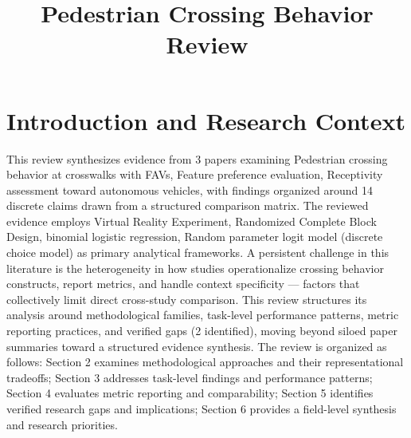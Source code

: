 \documentclass{article}
\title{Pedestrian Crossing Behavior Review}
\begin{document}
\maketitle
\section{Introduction and Research Context}
This review synthesizes evidence from 3 papers examining Pedestrian crossing behavior at crosswalks with FAVs, Feature preference evaluation, Receptivity assessment toward autonomous vehicles, with findings organized around 14 discrete claims drawn from a structured comparison matrix. The reviewed evidence employs Virtual Reality Experiment, Randomized Complete Block Design, binomial logistic regression, Random parameter logit model (discrete choice model) as primary analytical frameworks. A persistent challenge in this literature is the heterogeneity in how studies operationalize crossing behavior constructs, report metrics, and handle context specificity — factors that collectively limit direct cross-study comparison. This review structures its analysis around methodological families, task-level performance patterns, metric reporting practices, and verified gaps (2 identified), moving beyond siloed paper summaries toward a structured evidence synthesis. The review is organized as follows: Section 2 examines methodological approaches and their representational tradeoffs; Section 3 addresses task-level findings and performance patterns; Section 4 evaluates metric reporting and comparability; Section 5 identifies verified research gaps and implications; Section 6 provides a field-level synthesis and research priorities.
\end{document}
